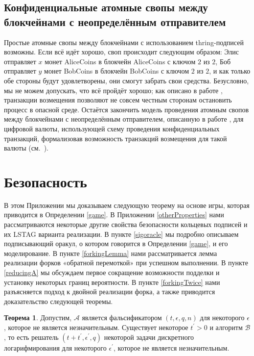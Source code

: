 \documentclass{mrl}
\theoremstyle{definition}
\newtheorem{theorem}{Теорема}
\numberwithin{theorem}{subsection}
\newcommand{\adversary}{\mathcal{A}}
\begin{document}
\subsection{Конфиденциальные атомные свопы между блокчейнами с неопределённым отправителем}

Простые атомные свопы между блокчейнами с использованием thring-подписей возможны. Если всё идёт хорошо, своп происходит следующим образом: Элис отправляет $x$ монет AliceCoins в блокчейн AliceCoins с ключом $2$ из $2$, Боб отправляет $y$ монет BobCoins в блокчейн BobCoins с ключом $2$ из $2$, и как только обе стороны будут удовлетворены, они смогут забрать свои средства. Безусловно, мы не можем допускать, что всё пройдёт хорошо; как описано в работе \cite{back2014enabling}, транзакции возмещения позволяют не совсем честным сторонам остановить процесс в опасной среде. Остаётся закончить модель проведения атомным свопов между блокчейнами с неопределённым отправителем, описанную в работе \cite{back2014enabling}, для цифровой валюты, использующей схему проведения конфиденциальных транзакций, формализовав возможность транзакций возмещения для такой валюты (см.\ \cite{noether2018dlsag}).




\appendix

\section{Безопасность}\label{security}

В этом Приложении мы доказываем следующую теорему на основе игры, которая приводится в Определении \ref{game}. В Приложении \ref{otherProperties} нами рассматриваются некоторые другие свойства безопасности кольцевых подписей и их LSTAG варианта реализации. В пункте \ref{sigoracle} мы подробно описываем подписывающий оракул, о котором говорится в Определении \ref{game}, и его моделирование. В пункте \ref{forkingLemma} нами рассматривается лемма реализации форков «обратной перемоткой» при успешном выполнении. В пункте \ref{reducingA} мы обсуждаем первое сокращение возможности подделки и установку некоторых границ вероятности. В пункте \ref{forkingTwice} нами разъясняется подход к двойной реализации форка, а также приводится доказательство следующей теоремы.

\begin{theorem}
Допустим, $\adversary$ является фальсификатором $(t,\epsilon,q,n)$ для некоторого $\epsilon$, которое не является незначительным. Существует некоторое $t^\prime > 0$ и алгоритм $\mathcal{B}$, то есть решатель $(t+t^\prime, \epsilon^\prime, q)$ некоторой задачи дискретного логарифмирования для некоторого $\epsilon^\prime$, которое не является незначительным.
\end{theorem}
\end{document}
